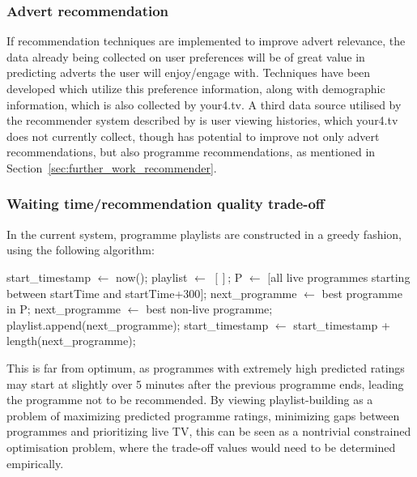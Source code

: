 	\subsubsection{Advert recommendation}

	If recommendation techniques are implemented to improve advert relevance, the data already being collected on user preferences will be of great value in predicting adverts the user will enjoy/engage with. Techniques have been developed \cite{contextual_advertising} which utilize this preference information, along with demographic \cite{contextual_advertising} information, which is also collected by your4.tv. A third data source utilised by the recommender system described by \cite{contextual_advertising} is user viewing histories, which your4.tv does not currently collect, though has potential to improve not only advert recommendations, but also programme recommendations, as mentioned in Section~\ref{sec:further_work_recommender}.

	\subsubsection{Waiting time/recommendation quality trade-off}
	In the current system, programme playlists are constructed in a greedy fashion, using the following algorithm:
	\begin{algorithmic}[H]
	\State start\_timestamp $\gets$ now();
	\State playlist $\gets$ $[]$;
		\State P $\gets$ $[$all live programmes starting between startTime and startTime+300$]$;
			\State next\_programme $\gets$ best programme in P;
		\Else
			\State next\_programme $\gets$ best non-live programme;
		\EndIf
		\State playlist.append(next\_programme);
		\State start\_timestamp $\gets$ start\_timestamp + length(next\_programme);
	\EndWhile
	\end{algorithmic}
	This is far from optimum, as programmes with extremely high predicted ratings may start at slightly over 5 minutes after the previous programme ends, leading the programme not to be recommended. By viewing playlist-building as a problem of maximizing predicted programme ratings, minimizing gaps between programmes and prioritizing live TV, this can be seen as a nontrivial constrained optimisation problem, where the trade-off values would need to be determined empirically.

